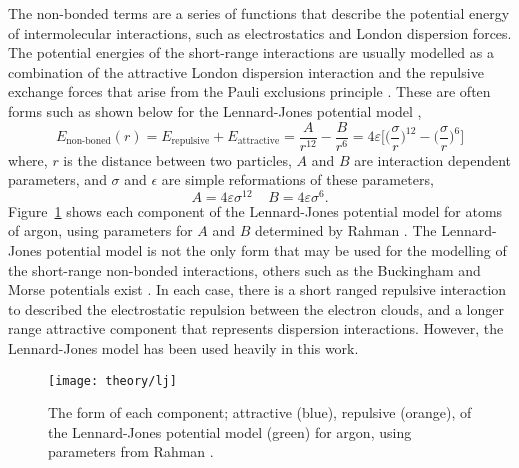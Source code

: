 The non-bonded terms are a series of functions that describe the potential energy of intermolecular interactions, such as electrostatics and London dispersion forces.
The potential energies of the short-range interactions are usually modelled as a combination of the attractive London dispersion interaction and the repulsive exchange forces that arise from the Pauli exclusions principle \cite{leach_molecular_1996}.
These are often forms such as shown below for the Lennard-Jones potential model \cite{lennard-jones_determination_1924},
%
\begin{equation}
  E_{\text{non-boned}}(r) = E_{\text{repulsive}} + E_{\text{attractive}} = \frac{A}{r^{12}} - \frac{B}{r^6} = 4\varepsilon\Bigg[\bigg(\frac{\sigma}{r}\bigg)^{12} - \bigg(\frac{\sigma}{r}\bigg)^6\Bigg]
\end{equation}
%
where, $r$ is the distance between two particles, $A$ and $B$ are interaction dependent parameters, and $\sigma$ and $\epsilon$ are simple reformations of these parameters,
%
\begin{equation}
  A = 4\varepsilon\sigma^{12} \;\;\;\; B = 4\varepsilon\sigma^6.
\end{equation}
%
Figure~\ref{fig:lj} shows each component of the Lennard-Jones potential model for atoms of argon, using parameters for $A$ and $B$ determined by Rahman \cite{rahman_correlations_1964}.
The Lennard-Jones potential model is not the only form that may be used for the modelling of the short-range non-bonded interactions, others such as the Buckingham and Morse potentials exist \cite{buckingham_classical_1938, morse_diatomic_1929}.
In each case, there is a short ranged repulsive interaction to described the electrostatic repulsion between the electron clouds, and a longer range attractive component that represents dispersion interactions.
However, the Lennard-Jones model has been used heavily in this work.
%
\begin{figure}
    \centering
    \texttt{[image: theory/lj]}
    \caption{The form of each component; attractive (blue), repulsive (orange), of the Lennard-Jones potential model (green) for argon, using parameters from Rahman \cite{rahman_correlations_1964}.}
    \label{fig:lj}
\end{figure}
%

